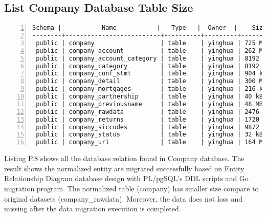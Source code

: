 \subsection{List Company Database Table Size}
\lstset{basicstyle=\ttfamily\tiny}  
\begin{lstlisting}[breaklines, frame=single, numbers=left, caption={List size of company normalized table.}, label=commandline-02]
 Schema |           Name           |   Type   |  Owner  |    Size    | Line counts  
--------+--------------------------+----------+---------+------------+-------------
 public | company                  | table    | yinghua | 725 MB     | 3595702  <-- same counts 
 public | company_account          | table    | yinghua | 262 MB     | 3595702
 public | company_account_category | table    | yinghua | 8192 bytes | 16
 public | company_category         | table    | yinghua | 8192 bytes | 21
 public | company_conf_stmt        | table    | yinghua | 904 kB     | 14900
 public | company_detail           | table    | yinghua | 300 MB     | 3595702
 public | company_mortgages        | table    | yinghua | 216 kB     | 3710
 public | company_partnership      | table    | yinghua | 40 kB      | 279
 public | company_previousname     | table    | yinghua | 48 MB      | 190185
 public | company_rawdata          | table    | yinghua | 2476 MB    | 3595702  <-- same counts 
 public | company_returns          | table    | yinghua | 1720 kB    | 28697
 public | company_siccodes         | table    | yinghua | 9872 kB    | 51693
 public | company_status           | table    | yinghua | 32 kB      | 14
 public | company_uri              | table    | yinghua | 164 MB     | 2033290

\end{lstlisting}

Listing P.8 shows all the database relation found in Company database. The result shows the normalized entity are migrated successfully based on Entity Relationship Diagram database design with PL/pgSQL's DDL scripts and Go migration program. The normalized table (company) has smaller size compare to original datasets (company\_rawdata). Moreover, the data does not loss and missing after the data migration execution is completed. 

\newpage

